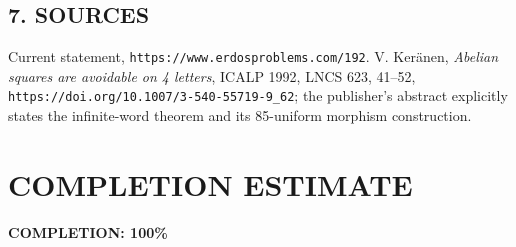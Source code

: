 \subsection*{7. SOURCES}
Current statement, \texttt{https://www.erdosproblems.com/192}. V. Ker\"anen, \emph{Abelian squares are avoidable on 4 letters}, ICALP 1992, LNCS 623, 41--52, \texttt{https://doi.org/10.1007/3-540-55719-9\_62}; the publisher's abstract explicitly states the infinite-word theorem and its 85-uniform morphism construction.
\section{COMPLETION ESTIMATE}
\textbf{COMPLETION: 100\%}
